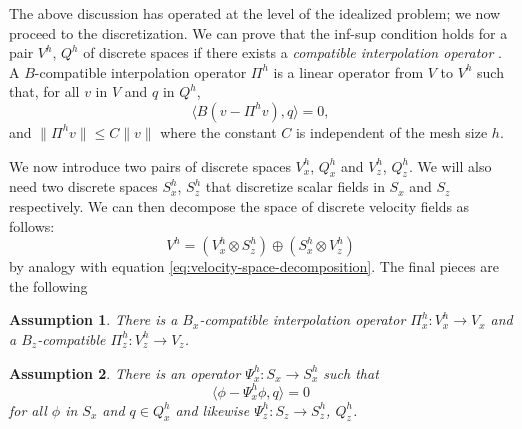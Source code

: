\documentclass{article}
\theoremstyle{definition}
\theoremstyle{plain}
\newtheorem{asm}{Assumption}
\begin{document}
The above discussion has operated at the level of the idealized problem; we now proceed to the discretization.
We can prove that the inf-sup condition holds for a pair $V^h$, $Q^h$ of discrete spaces if there exists a \emph{compatible interpolation operator} \citep{boffi2013mixed}.
A $B$-compatible interpolation operator $\Pi^h$ is a linear operator from $V$ to $V^h$ such that, for all $v$ in $V$ and $q$ in $Q^h$,
\begin{equation}
    \langle B(v - \Pi^hv), q\rangle = 0,
\end{equation}
and $\|\Pi^hv\| \le C\|v\|$ where the constant $C$ is independent of the mesh size $h$.

We now introduce two pairs of discrete spaces $V_x^h$, $Q_x^h$ and $V_z^h$, $Q_z^h$.
We will also need two discrete spaces $S_x^h$, $S_z^h$ that discretize scalar fields in $S_x$ and $S_z$ respectively.
We can then decompose the space of discrete velocity fields as follows:
\begin{equation}
    V^h = \left(V_x^h \otimes S_z^h\right)\oplus\left(S_x^h\otimes V_z^h\right)
\end{equation}
by analogy with equation \eqref{eq:velocity-space-decomposition}.
The final pieces are the following
\begin{asm} There is a $B_x$-compatible interpolation operator $\Pi_x^h : V_x^h \to V_x$ and a $B_z$-compatible $\Pi_z^h : V_z^h \to V_z$.
    \label{asm:b-compatible-operators}
\end{asm}
\begin{asm} There is an operator $\Psi_x^h : S_x \to S_x^h$ such that
    \begin{equation}
        \langle \phi - \Psi_x^h\phi, q\rangle = 0
    \end{equation}
    for all $\phi$ in $S_x$ and $q \in Q_x^h$ and likewise $\Psi_z^h : S_z \to S_z^h$, $Q_z^h$.
    \label{asm:ortho-projection}
\end{asm}
\end{document}
